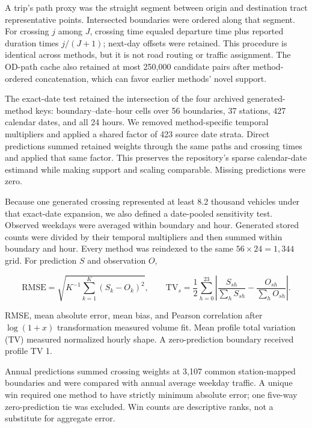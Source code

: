 \documentclass[numbered]{trbunofficial}
\newcommand{\TV}{\mathrm{TV}}
\begin{document}
A trip's path proxy was the straight segment between origin and destination tract representative points. Intersected boundaries were ordered along that segment. For crossing $j$ among $J$, crossing time equaled departure time plus reported duration times $j/(J+1)$; next-day offsets were retained. This procedure is identical across methods, but it is not road routing or traffic assignment. The OD-path cache also retained at most 250,000 candidate pairs after method-ordered concatenation, which can favor earlier methods' novel support.

The exact-date test retained the intersection of the four archived generated-method keys: \ExactHourlyCells{} boundary--date--hour cells over 56 boundaries, 37 stations, 427 calendar dates, and all 24 hours. We removed method-specific temporal multipliers and applied a shared factor of 423 source date strata. Direct predictions summed retained weights through the same paths and crossing times and applied that same factor. This preserves the repository's sparse calendar-date estimand while making support and scaling comparable. Missing predictions were zero.

Because one generated crossing represented at least 8.2 thousand vehicles under that exact-date expansion, we also defined a date-pooled sensitivity test. Observed weekdays were averaged within boundary and hour. Generated stored counts were divided by their temporal multipliers and then summed within boundary and hour. Every method was reindexed to the same $56\times24=1,344$ grid. For prediction $S$ and observation $O$,

\begin{linenomath*}
\begin{equation}
\mathrm{RMSE}=\sqrt{K^{-1}\sum_{k=1}^{K}(S_k-O_k)^2},\qquad
\TV_s=\frac12\sum_{h=0}^{23}\left|\frac{S_{sh}}{\sum_hS_{sh}}-\frac{O_{sh}}{\sum_hO_{sh}}\right|.
\label{eq:metrics}
\end{equation}
\end{linenomath*}
RMSE, mean absolute error, mean bias, and Pearson correlation after $\log(1+x)$ transformation measured volume fit. Mean profile total variation (TV) measured normalized hourly shape. A zero-prediction boundary received profile TV 1.

Annual predictions summed crossing weights at 3,107 common station-mapped boundaries and were compared with annual average weekday traffic. A unique win required one method to have strictly minimum absolute error; one five-way zero-prediction tie was excluded. Win counts are descriptive ranks, not a substitute for aggregate error.
\end{document}
